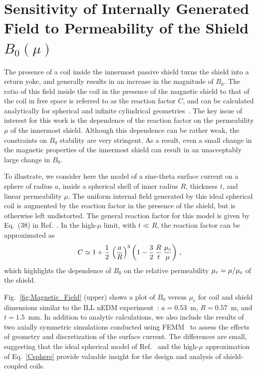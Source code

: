

\section{Sensitivity of Internally Generated Field to Permeability of the Shield $B_0(\mu)$\label{sec:calculation}}

The presence of a coil inside the innermost passive shield turns the
shield into a return yoke, and generally results in an increase in the
magnitude of $B_0$.  The ratio of this field inside the coil in the
presence of the magnetic shield to that of the coil in free space is
referred to as the reaction factor $C$, and can be calculated
analytically for spherical and infinite cylindrical
geometries~\cite{bib:bidinostimartin,bib:urankar}.  The key issue of
interest for this work is the dependence of the reaction factor on the
permeability $\mu$ of the innermost shield.  Although this dependence
can be rather weak, the constraints on $B_0$ stability are very
stringent.  As a result, even a small change in the magnetic
properties of the innermost shield can result in an unacceptably large
change in $B_0$.


To illustrate, we consider here the model of a sine-theta surface
current on a sphere of radius $a$, inside a spherical shell of inner
radius $R$, thickness $t$, and linear permeability $\mu$.  The uniform
internal field generated by this ideal spherical coil is augmented by
the reaction factor in the presence of the shield, but is otherwise
left undistorted.  The general reaction factor for this model is given
by Eq.~(38) in Ref.~\cite{bib:bidinostimartin}.  In the high-$\mu$
limit, with $t\ll R$, the reaction factor can be approximated as
\begin{equation}
C 
 \simeq 1+ \frac{1}{2}\, \left( \frac{a}{R} \right)^{3} \left( 1- \frac{3}{2} \, \frac{R}{t} \, \frac{\mu_{\scriptscriptstyle 0}}{\mu} \right) \, ,
 \label{Csphere}
\end{equation}
which highlights the dependence of $B_0$ on the relative permeability
$\mu_r=\mu/\mu_{\scriptscriptstyle 0}$ of the shield.

Fig.~\ref{fig:Magnetic_Field} (upper) shows a plot of $B_0$ versus
$\mu_r$ for coil and shield dimensions similar to the ILL nEDM
experiment~\cite{bib:baker,bib:knecht}: $a=0.53$~m, $R= 0.57$~m, and
$t=1.5$~mm.  In addition to analytic calculations, we also include the
results of two axially symmetric simulations conducted using
FEMM~\cite{bib:femm} to assess the effects of geometry and
discretization of the surface current.  The differences are small,
suggesting that the ideal spherical model of
Ref.~\cite{bib:bidinostimartin} and the high-$\mu$ approximation of
Eq.~\ref{Csphere} provide valuable insight for the design and analysis
of shield-coupled coils.

